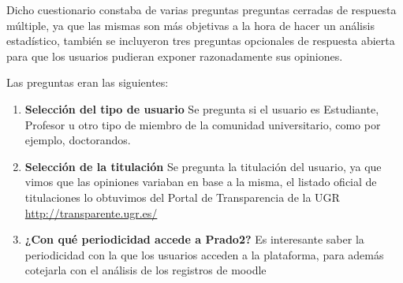 \bigskip
Dicho cuestionario constaba de varias preguntas preguntas cerradas de respuesta múltiple, ya que las mismas son más objetivas a la hora de hacer un análisis estadístico, también se incluyeron tres preguntas opcionales de respuesta abierta para que los usuarios pudieran exponer razonadamente sus opiniones.

Las preguntas eran las siguientes:

\begin{enumerate}

  \item \textbf{Selección del tipo de usuario} Se pregunta si el usuario es Estudiante, Profesor u otro tipo de miembro de la comunidad universitario, como por ejemplo, doctorandos.


  \item \textbf{Selección de la titulación} Se pregunta la titulación del usuario, ya que vimos que las opiniones variaban en base a la misma, el listado oficial de titulaciones lo obtuvimos del Portal de Transparencia de la UGR \url{http://transparente.ugr.es/}


  \item \textbf{¿Con qué periodicidad accede a Prado2?} Es interesante saber  la periodicidad con la que los usuarios acceden a la plataforma, para además cotejarla con el análisis de los registros de moodle



\end{enumerate}
